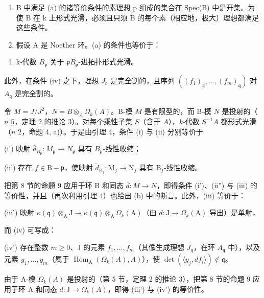 \begin{enumerate}
\def\labelenumi{\alph{enumi})}
\setcounter{enumi}{1}
\item
  B 中满足 (a) 的诸等价条件的素理想 p 组成的集合在 Spec(B) 中是开集。为使 B 在 k 上形式光滑，必须且只须 B 的每个素（相应地，极大）理想都满足这些条件。
\item
  假设 A 是 Noether 环。(a) 的条件也等价于：
\end{enumerate}

\begin{enumerate}
\def\labelenumi{(\alph{enumi})}
\setcounter{enumi}{21}
\tightlist
\item
  k-代数 \(B_{\mathfrak{p}}\) 关于 \(\mathfrak{p}B_{\mathfrak{p}}\)-进拓扑形式光滑。
\end{enumerate}

此外，在条件 (iv) 之下，理想 \(J_{\mathfrak{q}}\) 是完全割的，且序列 \(((f_{1})_{\mathfrak{q}},\ldots,(f_{m})_{\mathfrak{q}})\) 对 \(A_{\mathfrak{q}}\) 是完全割的。

令 \(M = J/J^{2}\)，\(N = B \otimes_{A} \Omega_{k}(A)\)。B-模 \(M\) 是有限型的，而 B-模 \(N\) 是投射的（\(n^{\circ} 5\)，定理 2 的推论 3）。对每个乘性子集 \(S\)（含于 \(A\)），\(k\)-代数 \(S^{-1}A\) 都形式光滑（\(n^{\circ} 2\)，命题 4, a)）。于是由引理 4，条件 (i) 与 (ii) 分别等价于

(i') 映射 \(\bar{d}_{B_{\mathfrak{p}}}:M_{\mathfrak{p}}\longrightarrow N_{\mathfrak{p}}\) 具有 \(B_{\mathfrak{p}}\)-线性收缩；

(ii') 存在 \(f \in \mathrm{B} - \mathfrak{p}\)，使映射 \(\tilde{d}_{\mathrm{B}_f}: \mathrm{M}_f \to \mathrm{N}_f\) 具有 \(\mathrm{B}_f\)-线性收缩。

把第 8 节的命题 9 应用于环 B 和同态 \(\bar{d}:M\to N\)，即得条件 (i')、(ii'') 与 (iii) 的等价性，并且（再次利用引理 4）也给出 (b) 中的断言。此外，(iii) 等价于：

(iii') 映射 \(\kappa(\mathfrak{q})\otimes_{\mathrm{A}}\mathrm{J}\longrightarrow\kappa(\mathfrak{q})\otimes_{\mathrm{A}}\Omega_{k}(\mathrm{A})\)（由 \(d:\mathrm{J}\to\Omega_{k}(\mathrm{A})\) 导出）是单射，

而 (iv) 可写成：

(iv') 存在整数 \(m\geqslant 0\)、J 的元素 \(f_{1},\ldots,f_{m}\)（其像生成理想 \(J_{\mathfrak{q}}\)，在环 \(A_{\mathfrak{q}}\) 中），以及元素 \(y_{1},\ldots,y_{m}\)（属于 \(\operatorname{Hom}_{\mathrm{A}}(\Omega_{k}(A),A)\)），使 \(\det(\langle y_{j},df_{i}\rangle)\notin\mathfrak{q}\)。

由于 \(\mathrm{A}\)-模 \(\Omega_{k}(A)\) 是投射的（第 5 节，定理 2 的推论 3），把第 8 节的命题 9 应用于环 A 和同态 \(d:\mathrm{J}\to\Omega_{k}(A)\)，即得 (iii') 与 (iv') 的等价性。

